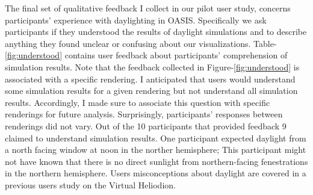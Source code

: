 The final set of qualitative feedback I collect in our pilot user study, concerns participants' experience with daylighting in OASIS.  Specifically we ask participants if they understood the results of daylight simulations and to describe anything they found unclear or confusing about our visualizations.  Table-\ref{fig:understood} contains user feedback about participants' comprehension of simulation results.  Note that the feedback collected in Figure-\ref{fig:understood} is associated with a specific rendering.  I anticipated that users would understand some simulation results for a given rendering but not understand all simulation results. Accordingly, I made sure to associate this question with specific renderings for future analysis.  Surprisingly, participants' responses between renderings did not vary.  Out of the 10 participants that provided feedback 9 claimed to understand simulation results.  One participant expected daylight from a north facing window at noon in the norther hemisphere; This participant might not have known that there is no direct sunlight from northern-facing fenestrations in the northern hemisphere.  Users misconceptions about daylight are covered in a previous users study on the Virtual Heliodion.  \\

